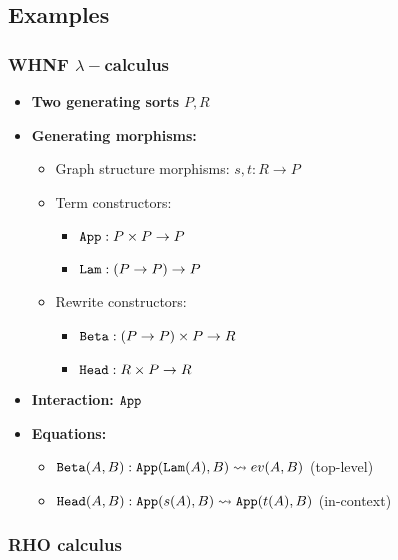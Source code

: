 \documentclass{article}
\begin{document}
\subsection{Examples}
\subsubsection{WHNF $\lambda-$calculus}

\begin{itemize}
    \item \textbf{Two generating sorts} $P, R$
    \item \textbf{Generating morphisms:}
    \begin{itemize}
        \item Graph structure morphisms: $s, t : R \to P$
        \item Term constructors: 
        \begin{itemize}
            \item ${\tt App} : P \times P \to P$
            \item ${\tt Lam} : (P \to P) \to P$
        \end{itemize}
        \item Rewrite constructors:
        \begin{itemize}
            \item ${\tt Beta} : (P \to P) \times P \to R$
            \item ${\tt Head} : R \times P \to R$
        \end{itemize}
    \end{itemize}
    \item \textbf{Interaction:} ${\tt App}$
    \item \textbf{Equations:}
    \begin{itemize}
        \item ${\tt Beta}(A, B) : {\tt App}({\tt Lam}(A), B) \leadsto ev(A, B)$ (top-level)
        \item ${\tt Head}(A, B) : {\tt App}(s(A), B) \leadsto {\tt App}(t(A), B)$ (in-context)
    \end{itemize}
\end{itemize}

\subsubsection{RHO calculus}
\end{document}
